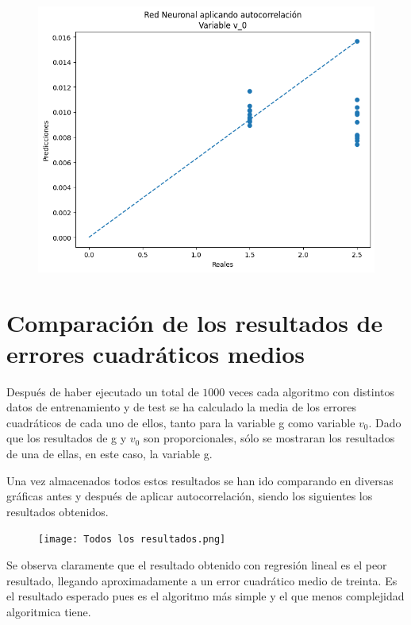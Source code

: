 \documentclass[oneside,openright,titlepage,numbers=noenddot,openany,headinclude,footinclude=true,
cleardoublepage=empty,abstractoff,BCOR=5mm,paper=a4,fontsize=12pt,main=spanish]{scrreprt}
\begin{document}
\begin{figure}[H]
	\centering
	\includegraphics[width=12cm]{Red Neuronal aplicando autocorrelación Variable v_0.png}
\end{figure}

\section{Comparación de los resultados de errores cuadráticos medios}

Después de haber ejecutado un total de $1000$ veces cada algoritmo con distintos datos de entrenamiento y de test se ha calculado la media de los errores cuadráticos de cada uno de ellos, tanto para la variable g como variable $v_0$. Dado que los resultados de g y $v_0$ son proporcionales, sólo se mostraran los resultados de una de ellas, en este caso, la variable g.

Una vez almacenados todos estos resultados se han ido comparando en diversas gráficas antes y después de aplicar autocorrelación, siendo los siguientes los resultados obtenidos.

\begin{figure}[H]
	\centering
	\texttt{[image: Todos los resultados.png]}
\end{figure}

Se observa claramente que el resultado obtenido con regresión lineal es el peor resultado, llegando aproximadamente a un error cuadrático medio de treinta. Es el resultado esperado pues es el algoritmo más simple y el que menos complejidad algoritmica tiene.
\end{document}
